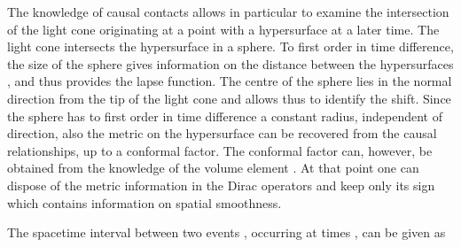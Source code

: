 \documentclass[a4paper,10pt,oneside]{amsart}
\theoremstyle{plain}
\theoremstyle{definition}
\theoremstyle{remark}
\begin{document}
The knowledge of causal contacts allows in particular to
examine the intersection of the light cone originating at a point
\coordHE{} with a hypersurface \coordHE{}
at a later time. The light cone intersects the hypersurface
\coordHE{} in a sphere. To first order in time
difference, the size of the sphere gives information on the
distance between the hypersurfaces \coordHE{},
\coordHE{} and thus provides the lapse function. The
centre of the sphere lies in the normal direction from the tip of
the light cone and allows thus to identify the shift. Since the
sphere has to first order in time difference a constant radius,
independent of direction, also the metric on the hypersurface can
be recovered from the causal relationships, up to a conformal
factor. The conformal factor can, however, be obtained from the
knowledge of the volume element \coordHE{}.  At that point
one can dispose of the metric information in the Dirac operators
\coordHE{} and keep only its sign \coordHE{} which contains information on spatial
smoothness.



The spacetime interval between two events \coordHE{}, \coordHE{}
occurring at times \coordHE{}, \coordHE{} can be given as
\end{document}
